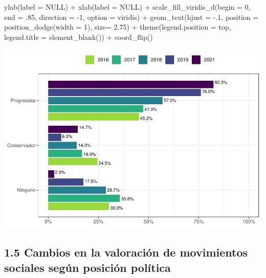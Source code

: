 \documentclass[
  12pt,
]{book}
\newenvironment{Shaded}{\begin{snugshade}}{\end{snugshade}}
\newcommand{\AttributeTok}[1]{\textcolor[rgb]{0.77,0.63,0.00}{#1}}
\newcommand{\ConstantTok}[1]{\textcolor[rgb]{0.00,0.00,0.00}{#1}}
\newcommand{\DecValTok}[1]{\textcolor[rgb]{0.00,0.00,0.81}{#1}}
\newcommand{\FloatTok}[1]{\textcolor[rgb]{0.00,0.00,0.81}{#1}}
\newcommand{\FunctionTok}[1]{\textcolor[rgb]{0.00,0.00,0.00}{#1}}
\newcommand{\NormalTok}[1]{#1}
\newcommand{\SpecialCharTok}[1]{\textcolor[rgb]{0.00,0.00,0.00}{#1}}
\newcommand{\StringTok}[1]{\textcolor[rgb]{0.31,0.60,0.02}{#1}}
\begin{document}
\begin{Shaded}
\begin{Highlighting}[]
    \FunctionTok{ylab}\NormalTok{(}\AttributeTok{label =} \ConstantTok{NULL}\NormalTok{) }\SpecialCharTok{+}
    \FunctionTok{xlab}\NormalTok{(}\AttributeTok{label =} \ConstantTok{NULL}\NormalTok{) }\SpecialCharTok{+}
    \FunctionTok{scale\_fill\_viridis\_d}\NormalTok{(}\AttributeTok{begin =} \DecValTok{0}\NormalTok{, }\AttributeTok{end =}\NormalTok{ .}\DecValTok{85}\NormalTok{, }\AttributeTok{direction =} \SpecialCharTok{{-}}\DecValTok{1}\NormalTok{, }\AttributeTok{option =} \StringTok{\textquotesingle{}viridis\textquotesingle{}}\NormalTok{) }\SpecialCharTok{+}
    \FunctionTok{geom\_text}\NormalTok{(}\AttributeTok{hjust =} \SpecialCharTok{{-}}\NormalTok{.}\DecValTok{1}\NormalTok{,}
            \AttributeTok{position =} \FunctionTok{position\_dodge}\NormalTok{(}\AttributeTok{width =} \DecValTok{1}\NormalTok{),}
            \AttributeTok{size=} \FloatTok{2.75}\NormalTok{) }\SpecialCharTok{+}
    \FunctionTok{theme}\NormalTok{(}\AttributeTok{legend.position =} \StringTok{\textquotesingle{}top\textquotesingle{}}\NormalTok{,}
          \AttributeTok{legend.title =} \FunctionTok{element\_blank}\NormalTok{()) }\SpecialCharTok{+}
  \FunctionTok{coord\_flip}\NormalTok{()}
\end{Highlighting}
\end{Shaded}

\includegraphics{reporte-elsoc_files/figure-latex/unnamed-chunk-9-1.pdf}

\hypertarget{cambios-en-la-valoraciuxf3n-de-movimientos-sociales-seguxfan-posiciuxf3n-poluxedtica}{%
\subsection{1.5 Cambios en la valoración de movimientos sociales según posición política}\label{cambios-en-la-valoraciuxf3n-de-movimientos-sociales-seguxfan-posiciuxf3n-poluxedtica}}
\end{document}
